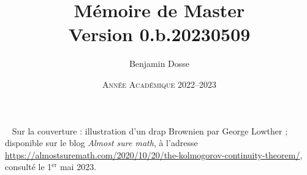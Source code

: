\documentclass[a4paper, 11pt]{book}
\title{Mémoire de Master\\Version 0.b.20230509}\let\thetitle\@title
\date{\textsc{Année Académique 2022--2023}}\let\thedate\@date
\author{Benjamin Dosse}\let\theauthor\@author
\begin{document}
\frontmatter

\maketitle
\newpage\null\thispagestyle{empty}\newpage
~\vfill
\footnotesize Sur la couverture : illustration d'un drap
Brownien par George Lowther ; disponible sur le blog \emph{Almost
  sure math}, à l'adresse
\url{https://almostsuremath.com/2020/10/20/the-kolmogorov-continuity-theorem/},
consulté le 1$^{\text{er}}$ mai 2023.
\normalsize
\printnomenclature
\tableofcontents

\mainmatter

    
    
    
    

\nocite{*}
\printbibliography[heading=bibintoc]
\end{document}
